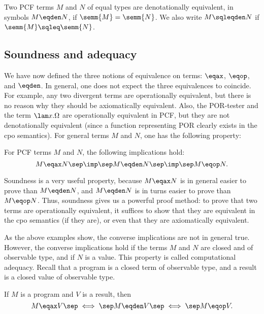 \documentclass[12pt]{article}
\begin{document}
\begin{definition}
  Two PCF terms $M$ and $N$ of equal types are denotationally
  equivalent, in symbols $M\eqden N$, if $\semm{M}=\semm{N}$. 
  We also write $M\sqleqden N$ if $\semm{M}\sqleq\semm{N}$.
\end{definition}

\subsection{Soundness and adequacy}

We have now defined the three notions of equivalence on terms:
$\eqax$, $\eqop$, and $\eqden$. In general, one does not expect the
three equivalences to coincide. For example, any two divergent terms
are operationally equivalent, but there is no reason why they should
be axiomatically equivalent. Also, the POR-tester and the term $\lam
x.\Omega$ are operationally equivalent in PCF, but they are not
denotationally equivalent (since a function representing POR clearly
exists in the cpo semantics). For general terms $M$ and $N$, one has
the following property:

\begin{theorem}[Soundness]
  For PCF terms $M$ and $N$, the following implications hold:
  \[ M\eqax N \sep\imp\sep M\eqden N  \sep\imp\sep  M\eqop N.
  \]
\end{theorem}

Soundness is a very useful property, because $M\eqax N$ is in general
easier to prove than $M\eqden N$, and $M\eqden N$ is in turns easier
to prove than $M\eqop N$. Thus, soundness gives us a powerful proof
method: to prove that two terms are operationally equivalent, it
suffices to show that they are equivalent in the cpo semantics (if
they are), or even that they are axiomatically equivalent. 

As the above examples show, the converse implications are not in
general true. However, the converse implications hold if the terms $M$
and $N$ are closed and of observable type, and if $N$ is a value. This
property is called computational adequacy. Recall that a program is a
closed term of observable type, and a result is a closed value of
observable type. 

\begin{theorem}
  If $M$ is a program and $V$ is a result, then
  \[ M\eqax V \sep\iff\sep M\eqden V  \sep\iff\sep  M\eqop V.
  \]
\end{theorem}
\end{document}
